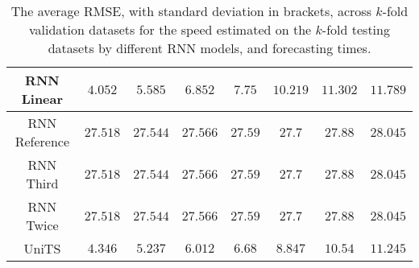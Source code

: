 \begin{table}[!ht]
{\begin{tabular}{|c|c|c|c|c|c|c|c|}
			RNN Linear & $4.052$ & $5.585$ & $6.852$ & $7.75$ & $10.219$ & $11.302$ & $11.789$ \\ \hline
			RNN Reference & $27.518$ & $27.544$ & $27.566$ & $27.59$ & $27.7$ & $27.88$ & $28.045$ \\ \hline
			RNN Third & $27.518$ & $27.544$ & $27.566$ & $27.59$ & $27.7$ & $27.88$ & $28.045$ \\ \hline
			RNN Twice & $27.518$ & $27.544$ & $27.566$ & $27.59$ & $27.7$ & $27.88$ & $28.045$ \\ \hline
			UniTS & $4.346$ & $\mathbf{5.237}$ & $\mathbf{6.012}$ & $\mathbf{6.68}$ & $\mathbf{8.847}$ & $\mathbf{10.54}$ & $\mathbf{11.245}$ \\ \hline
		\end{tabular}
	}
	\caption{The average RMSE, with standard deviation in brackets, across $k$-fold validation datasets for the speed estimated on the $k$-fold testing datasets by different RNN models, and forecasting times.}
	\label{tab:all_speed_RMSE}
\end{table}